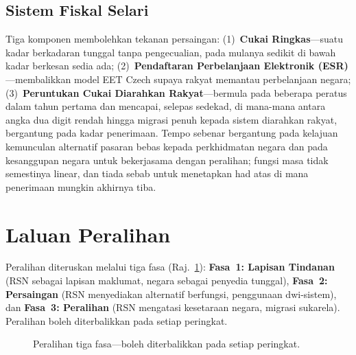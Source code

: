 \documentclass[11pt,a4paper,twocolumn]{article}
\begin{document}
\subsection{Sistem Fiskal Selari}

Tiga komponen membolehkan tekanan persaingan: (1)~\textbf{Cukai Ringkas}---suatu kadar berkadaran tunggal tanpa pengecualian, pada mulanya sedikit di bawah kadar berkesan sedia ada; (2)~\textbf{Pendaftaran Perbelanjaan Elektronik (ESR)}---membalikkan model EET Czech supaya rakyat memantau perbelanjaan negara; (3)~\textbf{Peruntukan Cukai Diarahkan Rakyat}---bermula pada beberapa peratus dalam tahun pertama dan mencapai, selepas sedekad, di mana-mana antara angka dua digit rendah hingga migrasi penuh kepada sistem diarahkan rakyat, bergantung pada kadar penerimaan. Tempo sebenar bergantung pada kelajuan kemunculan alternatif pasaran bebas kepada perkhidmatan negara dan pada kesanggupan negara untuk bekerjasama dengan peralihan; fungsi masa tidak semestinya linear, dan tiada sebab untuk menetapkan had atas di mana penerimaan mungkin akhirnya tiba.

\section{Laluan Peralihan}

Peralihan diteruskan melalui tiga fasa (Raj.~\ref{fig:migration}): \textbf{Fasa~1: Lapisan Tindanan} (RSN sebagai lapisan maklumat, negara sebagai penyedia tunggal), \textbf{Fasa~2: Persaingan} (RSN menyediakan alternatif berfungsi, penggunaan dwi-sistem), dan \textbf{Fasa~3: Peralihan} (RSN mengatasi kesetaraan negara, migrasi sukarela). Peralihan boleh diterbalikkan pada setiap peringkat.

\begin{figure}[ht]
\centering
{}
\caption{Peralihan tiga fasa---boleh diterbalikkan pada setiap peringkat.}
\label{fig:migration}
\end{figure}
\end{document}
